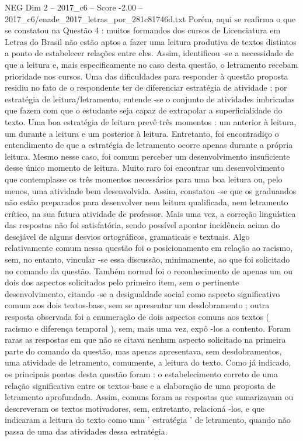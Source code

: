 \begin{textsample}{NEG Dim 2 – 2017\_c6 – Score -2.00 – 2017\_c6/enade\_2017\_letras\_por\_281c81746d.txt}
Porém, aqui se reafirma o que se constatou na Questão 4 : muitos formandos dos cursos de Licenciatura em Letras do Brasil não estão aptos a fazer uma leitura produtiva de textos distintos a ponto de estabelecer relações entre eles.
Assim, identificou -se a necessidade de que a leitura e, mais especificamente no caso desta questão, o letramento recebam prioridade nos cursos.
Uma das dificuldades para responder à questão proposta residiu no fato de o respondente ter de diferenciar estratégia de atividade ; por estratégia de leitura/letramento, entende -se o conjunto de atividades imbricadas que fazem com que o estudante seja capaz de extrapolar a superficialidade do texto.
Uma boa estratégia de leitura prevê três momentos : um anterior à leitura, um durante a leitura e um posterior à leitura.
Entretanto, foi encontradiço o entendimento de que a estratégia de letramento ocorre apenas durante a própria leitura.
Mesmo nesse caso, foi comum perceber um desenvolvimento insuficiente desse único momento de leitura.
Muito raro foi encontrar um desenvolvimento que contemplasse os três momentos necessários para uma boa leitura ou, pelo menos, uma atividade bem desenvolvida.
Assim, constatou -se que os graduandos não estão preparados para desenvolver nem leitura qualificada, nem letramento crítico, na sua futura atividade de professor.
Mais uma vez, a correção linguística das respostas não foi satisfatória, sendo possível apontar incidência acima do desejável de alguns desvios ortográficos, gramaticais e textuais.
Algo relativamente comum nessa questão foi o posicionamento em relação ao racismo, sem, no entanto, vincular -se essa discussão, minimamente, ao que foi solicitado no comando da questão.
Também normal foi o reconhecimento de apenas um ou dois dos aspectos solicitados pelo primeiro item, sem o pertinente desenvolvimento, citando -se a desigualdade social como aspecto significativo comum aos dois textos-base, sem se apresentar um desdobramento ; outra resposta observada foi a enumeração de dois aspectos comuns aos textos ( racismo e diferença temporal ), sem, mais uma vez, expô -los a contento.
Foram raras as respostas em que não se citava nenhum aspecto solicitado na primeira parte do comando da questão, mas apenas apresentava, sem desdobramentos, uma atividade de letramento, comumente, a leitura do texto.
Como já indicado, os principais pontos desta questão foram : o estabelecimento correto de uma relação significativa entre os textos-base e a elaboração de uma proposta de letramento aprofundada.
Assim, comuns foram as respostas que sumarizavam ou descreveram os textos motivadores, sem, entretanto, relacioná -los, e que indicaram a leitura do texto como uma ' estratégia ' de letramento, quando não passa de uma das atividades dessa estratégia.

\end{textsample}

